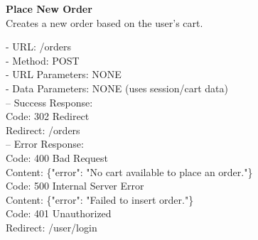 \begin{flushleft}
    \textbf{Place New Order} \\
    Creates a new order based on the user’s cart.

    - URL: /orders \\
    - Method: POST \\
    - URL Parameters: NONE \\
    - Data Parameters: NONE (uses session/cart data) \\
    – Success Response: \\
    Code: 302 Redirect \\
    Redirect: /orders \\
    – Error Response: \\
    Code: 400 Bad Request \\
    Content: \{"error": "No cart available to place an order."\} \\
    Code: 500 Internal Server Error \\
    Content: \{"error": "Failed to insert order."\} \\
    Code: 401 Unauthorized \\
    Redirect: /user/login
\end{flushleft}
